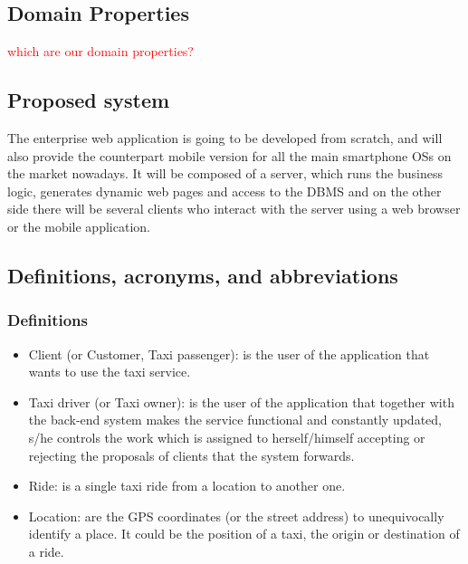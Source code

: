 \documentclass[a4paper,11pt]{report} %
\begin{document}
	\subsection{Domain Properties} \textcolor{red}{which are our domain properties?}
	
	\subsection{Proposed system}
	The enterprise web application is going to be developed from scratch, and will also provide the counterpart mobile version for all the main smartphone OSs on the market nowadays. It will be composed of a server, which runs the business logic, generates dynamic web pages and access to the DBMS and on the other side there will be several clients who interact with the server using a web browser or the mobile application.
	
	\subsection{Definitions, acronyms, and abbreviations}
	
	\subsubsection{Definitions}
		\begin{itemize}
			\item Client (or Customer, Taxi passenger): is the user of the application that wants to use the taxi service.
			\item Taxi driver (or Taxi owner): is the user of the application that together with the back-end system makes the service functional and constantly updated, s/he controls the work which is assigned to herself/himself accepting or rejecting the proposals of clients that the system forwards. 
			\item Ride: is a single taxi ride from a location to another one.
			\item Location: are the GPS coordinates (or the street address) to unequivocally identify a place. It could be the position of a taxi, the origin or destination of a ride.
		\end{itemize}
		
\end{document}
